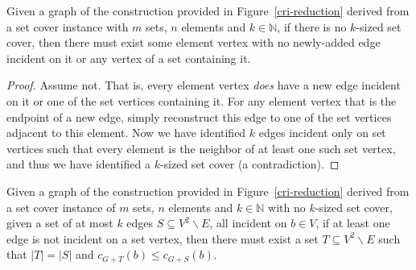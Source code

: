 \begin{claim} \label{clm:noedges}
    Given a graph of the construction provided in Figure~\ref{cri-reduction} derived from a set cover instance with $m$ sets, $n$ elements and $k\in\mathbb{N}$, if there is no $k$-sized set cover, then there must exist some element vertex with no newly-added edge incident on it or any vertex of a set containing it.
\end{claim}
\begin{proof}
   Assume not. That is, every element vertex \textit{does} have a new edge incident on it or one of the set vertices containing it. For any element vertex that is the endpoint of a new edge, simply reconstruct this edge to one of the set vertices adjacent to this element. Now we have identified $k$ edges incident only on set vertices such that every element is the neighbor of at least one such set vertex, and thus we have identified a $k$-sized set cover (a contradiction). 
\end{proof}

\begin{claim} \label{clm:set-incident}
    Given a graph of the construction provided in Figure~\ref{cri-reduction} derived from a set cover instance of $m$ sets, $n$ elements and $k\in\mathbb{N}$ with no $k$-sized set cover, given a set of at most $k$ edges $S\subseteq V^2\backslash E$, all incident on $b\in V$, if at least one edge is not incident on a set vertex, then there must exist a set $T\subseteq V^2\backslash E$ such that $|T|=|S|$ and $c_{G+T}(b)\leq c_{G+S}(b)$.
\end{claim}


